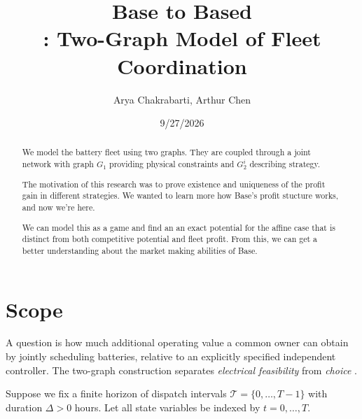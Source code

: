 \documentclass[11pt]{article}
\title{Base to Based\\[3pt]
\large : Two-Graph Model of Fleet Coordination}
\author{Arya Chakrabarti, Arthur Chen}
\date{9/27/2026}
\theoremstyle{remark}
\newcommand{\T}{\mathcal T}
\begin{document}
\maketitle

\begin{abstract}
We model the battery fleet using two 
graphs.  They are coupled through a joint network with graph $G_1$ providing physical constraints and $G_2^i$ describing strategy. 

The motivation of this research was to prove existence and 
uniqueness of the profit gain in different strategies. We wanted to learn more how Base's profit stucture works, and now we're here.

We can model this as a game and find an an exact potential for the affine case that is distinct from both
competitive potential and fleet profit. From this, we can get a better understanding about the market making abilities of Base. 


\end{abstract}

\tableofcontents

\section{Scope}
\label{sec:setup}

A question is how much additional operating value a common owner
can obtain by jointly scheduling batteries, relative to an explicitly
specified independent controller. The two-graph construction separates
\emph{electrical feasibility} from \emph{ choice }.

Suppose we fix a finite horizon of dispatch intervals
$\T=\{0,\ldots,T-1\}$ with duration $\Delta>0$ hours. Let all state variables be
indexed by $t=0,\ldots,T$. 
\end{document}
